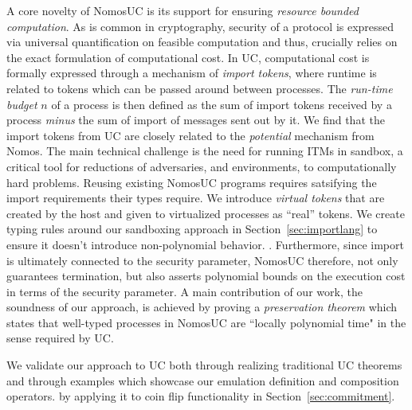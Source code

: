 A core novelty of NomosUC is its support for ensuring \emph{resource bounded computation}.
As is common in cryptography, security of a protocol is expressed via universal quantification
on feasible computation and thus, crucially relies on the exact formulation of computational cost.
In UC, computational cost is formally expressed through a mechanism of \emph{import tokens}, where runtime is related to tokens which can be passed around between processes.
The \emph{run-time budget} $n$ of a process is then defined as the sum of import tokens received by a process \emph{minus} the sum of import of messages sent out by it.
We find that the import tokens from UC are closely related to the \emph{potential} mechanism from Nomos.
The main technical challenge is the need for running ITMs in sandbox, a critical tool for reductions of adversaries, and environments, to computationally hard problems.
Reusing existing NomosUC programs requires satsifying the import requirements their types require.
We introduce \emph{virtual tokens} that are created by the host and given to virtualized processes as ``real'' tokens. 
We create typing rules around our sandboxing approach in Section~\ref{sec:importlang} to ensure it doesn't introduce non-polynomial behavior.
.
Furthermore, since import is ultimately connected to the security parameter, NomosUC
therefore, not only guarantees termination, but also asserts polynomial bounds on
the execution cost in terms of the security parameter.
A main contribution of our work, the soundness of our approach, is achieved by proving a \emph{preservation theorem}
which states that well-typed processes in NomosUC are ``locally polynomial time"
in the sense required by UC.

We validate our approach to UC both through realizing traditional UC theorems and through examples which showcase our emulation definition and composition operators.
by applying it to coin flip functionality \Fflip in Section~\ref{sec:commitment}.

